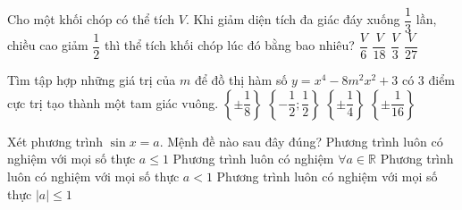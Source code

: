 \begin{ex}%
	Cho một khối chóp có thể tích $V$. Khi giảm diện tích đa giác đáy xuống $\dfrac{1}{3}$ lần, chiều cao giảm $\dfrac{1}{2}$  thì thể tích khối chóp lúc đó bằng bao nhiêu?
	\choice
	{\True $\dfrac{V}{6}$}
	{$\dfrac {V}{18}$}
	{$\dfrac{V}{3}$}
	{$\dfrac{V}{27}$}
\end{ex}

\begin{ex}%
	Tìm tập hợp những giá trị của $m$ để đồ thị hàm số $y=x^{4}-8m^{2}x^{2}+3$ có 3 điểm cực trị tạo thành một tam giác vuông.
	\choice
	{$\left\{\pm \dfrac{1}{8}\right\}$}
	{\True $\left\{-\dfrac{1}{2};\dfrac{1}{2}\right\}$}
	{$\left\{\pm \dfrac{1}{4}\right\}$}
	{$\left\{\pm \dfrac{1}{16}\right\}$}
\end{ex}

\begin{ex}%
	Xét phương trình $\sin x=a$. Mệnh đề nào sau đây đúng?
	\choice
	{Phương trình luôn có nghiệm với mọi số thực $a\le 1$}
	{Phương trình luôn có nghiệm $\forall a\in \mathbb{R}$}
	{Phương trình luôn có nghiệm với mọi số thực $a<1$}
	{\True Phương trình luôn có nghiệm với mọi số thực $|a|\le 1$}
	\loigiai{	}
\end{ex}

